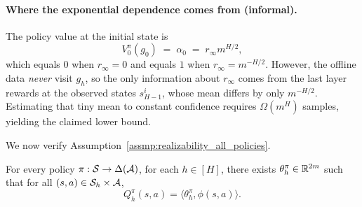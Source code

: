 \paragraph{Where the exponential dependence comes from (informal).}
The policy value at the initial state is
\[
V_0^\pi(g_0) \;=\; \alpha_0 \;=\; r_\infty m^{H/2},
\]
which equals $0$ when $r_\infty=0$ and equals $1$ when $r_\infty=m^{-H/2}$.
However, the offline data \emph{never} visit $g_h$, so the only information about
$r_\infty$ comes from the last layer rewards at the observed states $s_{H-1}^i$,
whose mean differs by only $m^{-H/2}$.  Estimating that tiny mean to constant
confidence requires $\Omega(m^H)$ samples, yielding the claimed lower bound.


We now verify Assumption~\ref{assmp:realizability_all_policies}.

\begin{lemma}
\label{lem:q_linear_offline_hard}
For every policy $\pi:\mathcal{S}\to\Delta(\mathcal{A})$, for each $h\in[H]$, there exists
$\theta_h^\pi\in\mathbb{R}^{2m}$ such that for all $(s,a)\in\mathcal{S}_h\times\mathcal{A}$,
\[
Q_h^\pi(s,a) = \langle \theta_h^\pi, \phi(s,a)\rangle.
\]
\end{lemma}

